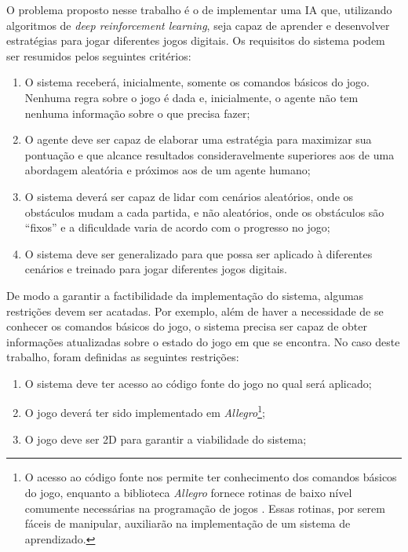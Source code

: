  O problema proposto nesse trabalho é o de implementar uma IA que, utilizando algoritmos de \textit{deep reinforcement learning}, seja capaz de aprender e desenvolver estratégias para jogar diferentes jogos digitais. Os requisitos do sistema podem ser resumidos pelos seguintes critérios:
\begin{enumerate}
	\item O sistema receberá, inicialmente, somente os comandos básicos do jogo. Nenhuma regra sobre o jogo é dada e, inicialmente, o agente não tem nenhuma informação sobre o que precisa fazer;
	\item O agente deve ser capaz de elaborar uma estratégia para maximizar sua pontuação e que alcance resultados consideravelmente superiores aos de uma abordagem aleatória e próximos aos de um agente humano;
	\item O sistema deverá ser capaz de lidar com cenários aleatórios, onde os obstáculos mudam a cada partida, e não aleatórios, onde os obstáculos são ``fixos'' e a dificuldade varia de acordo com o progresso no jogo;
	\item O sistema deve ser generalizado para que possa ser aplicado à diferentes cenários e treinado para jogar diferentes jogos digitais.
\end{enumerate}

De modo a garantir a factibilidade da implementação do sistema, algumas restrições devem ser acatadas. Por exemplo, além de haver a necessidade de se conhecer os comandos básicos do jogo, o sistema precisa ser capaz de obter informações atualizadas sobre o estado do jogo em que se encontra. No caso deste trabalho, foram definidas as seguintes restrições:

\begin{enumerate}
	\item O sistema deve ter acesso ao código fonte do jogo no qual será aplicado;
	\item O jogo deverá ter sido implementado em \textit{Allegro}\footnote{O acesso ao código fonte nos permite ter conhecimento dos comandos básicos do jogo, enquanto a biblioteca \textit{Allegro} fornece rotinas de baixo nível comumente necessárias na programação de jogos \cite{allegro}. Essas rotinas, por serem fáceis de manipular, auxiliarão na implementação de um sistema de aprendizado.};
	\item O jogo deve ser 2D para garantir a viabilidade do sistema;
\end{enumerate}









